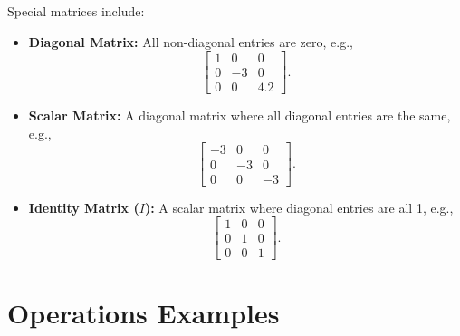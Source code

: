 \documentclass{article}
\begin{document}
Special matrices include:
\begin{itemize}
  \item \textbf{Diagonal Matrix:} All non-diagonal entries are zero, e.g.,
    \[
      \begin{bmatrix}
        1 & 0 & 0 \\
        0 & -3 & 0 \\
        0 & 0 & 4.2
      \end{bmatrix}.
    \]
  \item \textbf{Scalar Matrix:} A diagonal matrix where all diagonal entries are the same, e.g.,
    \[
      \begin{bmatrix}
        -3 & 0 & 0 \\
        0 & -3 & 0 \\
        0 & 0 & -3
      \end{bmatrix}.
    \]
  \item \textbf{Identity Matrix ($I$):} A scalar matrix where diagonal entries are all 1, e.g.,
    \[
      \begin{bmatrix}
        1 & 0 & 0 \\
        0 & 1 & 0 \\
        0 & 0 & 1
      \end{bmatrix}.
    \]
\end{itemize}

\section*{Operations Examples}
\end{document}
